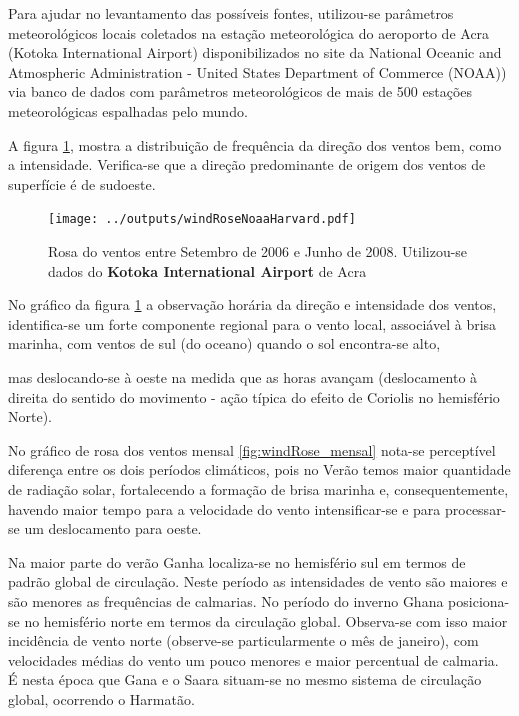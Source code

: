 Para ajudar no levantamento das possíveis fontes, utilizou-se parâmetros 
meteorológicos locais coletados na estação meteorológica do aeroporto de Acra 
(Kotoka International Airport) disponibilizados no site da 
National Oceanic and Atmospheric Administration - United States Department of 
Commerce (NOAA)) via banco de dados com parâmetros meteorológicos 
de mais de 500 estações meteorológicas espalhadas pelo mundo.

A figura \ref{fg:rosaCompleta}, 
mostra a distribuição de frequência da direção dos ventos bem, como a 
intensidade. 
Verifica-se que a direção predominante de origem dos ventos de superfície
é de sudoeste. 

\begin{figure}[H]
  \centering
  \texttt{[image: ../outputs/windRoseNoaaHarvard.pdf]}
  \caption{Rosa do ventos entre
           Setembro de 2006 e Junho de 2008. Utilizou-se dados 
           do \textbf{Kotoka International Airport} de Acra 
           \label{fg:rosaCompleta}}
\end{figure}%

No gráfico da figura \ref{fg:rosaCompleta}%
 a observação horária da direção e 
intensidade dos ventos, identifica-se um forte componente regional para o vento local, associável à brisa marinha, com ventos de sul (do oceano) quando o sol encontra-se alto,%

 mas deslocando-se à oeste na medida que as horas avançam (deslocamento à direita do sentido do movimento - ação típica do efeito de Coriolis no hemisfério Norte). 

No gráfico de rosa dos ventos mensal \ref{fig:windRose_mensal}
 nota-se 
perceptível diferença entre os dois períodos climáticos, 
pois no Verão temos maior quantidade de radiação solar, fortalecendo a 
formação de brisa marinha e, consequentemente, havendo maior tempo para a velocidade do vento intensificar-se e para processar-se um deslocamento para oeste.

Na maior parte do verão Ganha localiza-se no hemisfério sul em termos de padrão global 
de circulação. Neste período as intensidades de vento são maiores e são menores as 
frequências de calmarias. No período do inverno Ghana posiciona-se no hemisfério
 norte em termos da circulação global. 
Observa-se com isso maior incidência de vento norte (observe-se particularmente o mês 
de janeiro), com velocidades médias do vento um pouco menores e maior percentual de 
calmaria. É nesta época que Gana e o Saara situam-se no mesmo sistema de circulação 
global, ocorrendo o Harmatão. 

